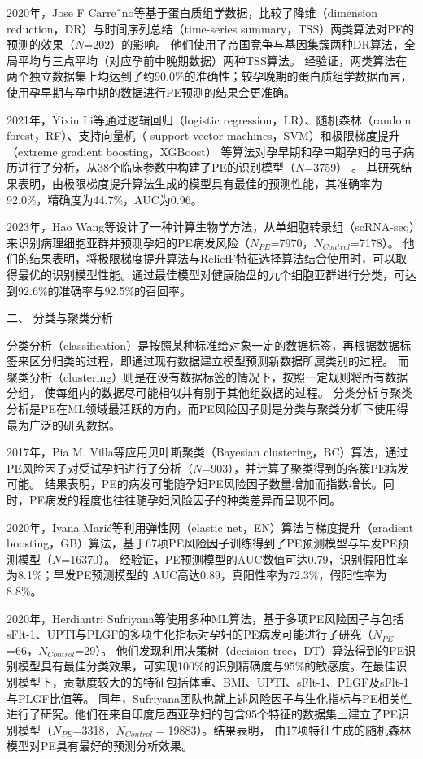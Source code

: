 2020年，Jose F Carre˜no等\cite{Carreno2020}基于蛋白质组学数据，比较了降维（dimension reduction，DR）与时间序列总结（time-series summary，TSS）两类算法对PE的预测的效果（$N$=202）的影响。
他们使用了帝国竞争与基因集簇两种DR算法，全局平均与三点平均（对应孕前中晚期数据）两种TSS算法。
经验证，两类算法在两个独立数据集上均达到了约90.0\%的准确性；较孕晚期的蛋白质组学数据而言，使用孕早期与孕中期的数据进行PE预测的结果会更准确。

2021年，Yixin Li等\cite{LI2021102}通过逻辑回归（logistic regression，LR）、随机森林（random forest，RF）、支持向量机（ support vector machines，SVM）和极限梯度提升（extreme gradient boosting，XGBoost）
等算法对孕早期和孕中期孕妇的电子病历进行了分析，从38个临床参数中构建了PE的识别模型（$N$=3759） 。
其研究结果表明，由极限梯度提升算法生成的模型具有最佳的预测性能，其准确率为92.0\%，精确度为44.7\%，AUC为0.96。

2023年，Hao Wang等\cite{HW2023}设计了一种计算生物学方法，从单细胞转录组（scRNA-seq）来识别病理细胞亚群并预测孕妇的PE病发风险（$N_{PE}$=7970，$N_{Control}$=7178）。
他们的结果表明，将极限梯度提升算法与ReliefF特征选择算法结合使用时，可以取得最优的识别模型性能。通过最佳模型对健康胎盘的九个细胞亚群进行分类，可达到92.6\%的准确率与92.5\%的召回率。

二、 分类与聚类分析

分类分析（classification）是按照某种标准给对象一定的数据标签，再根据数据标签来区分归类的过程，即通过现有数据建立模型预测新数据所属类别的过程。
而聚类分析（clustering）则是在没有数据标签的情况下，按照一定规则将所有数据分组，
使每组内的数据尽可能相似并有别于其他组数据的过程\cite{Han2006}。
分类分析与聚类分析是PE在ML领域最活跃的方向，而PE风险因子则是分类与聚类分析下使用得最为广泛的研究数据。

2017年，Pia M. Villa等\cite{Villa2017}应用贝叶斯聚类（Bayesian clustering，BC）算法，通过PE风险因子对受试孕妇进行了分析（$N$=903），并计算了聚类得到的各簇PE病发可能。
结果表明，PE的病发可能随孕妇PE风险因子数量增加而指数增长。同时，PE病发的程度也往往随孕妇风险因子的种类差异而呈现不同。

2020年，Ivana Mari{\'{c}}等\cite{Maric2020}利用弹性网（elastic net，EN）算法与梯度提升（gradient boosting，GB）算法，基于67项PE风险因子训练得到了PE预测模型与早发PE预测模型（$N$=16370）。
经验证，PE预测模型的AUC数值可达0.79，识别假阳性率为8.1\%；早发PE预测模型的
AUC高达0.89，真阳性率为72.3\%，假阳性率为8.8\%。

2020年，Herdiantri Sufriyana等\cite{Sufriyana2020-1}使用多种ML算法，基于多项PE风险因子与包括sFlt-1、UPTI与PLGF的多项生化指标对孕妇的PE病发可能进行了研究（$N_{PE}$=66，$N_{Control}$=29）。
他们发现利用决策树（decision tree，DT）算法得到的PE识别模型具有最佳分类效果，可实现100\%的识别精确度与95\%的敏感度。在最佳识别模型下，贡献度较大的的特征包括体重、BMI、UPTI、sFlt-1、PLGF及sFlt-1与PLGF比值等。
同年，Sufriyana团队也就上述风险因子与生化指标与PE相关性进行了研究\cite{Sufriyana2020}。他们在来自印度尼西亚孕妇的包含95个特征的数据集上建立了PE识别模型（$N_{PE}$=3318，$N_{Control}=$19883）。结果表明，
由17项特征生成的随机森林模型对PE具有最好的预测分析效果。

